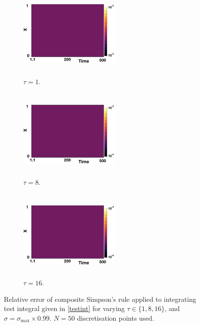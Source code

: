 \begin{figure}[H]
    \centering
    \begin{subfigure}[t]{0.32\textwidth}
        \centering
        \includegraphics[width=5cm,height=4.5cm]{disterr.png}
        \caption{$\tau=1$.}
        \label{}
    \end{subfigure}
    \hfill
    \begin{subfigure}[t]{0.32\textwidth}
        \centering
        \includegraphics[width=5cm,height=4.5cm]{disterr.png}
        \caption{$\tau=8$.}
        \label{}
    \end{subfigure}
    \hfill
    \begin{subfigure}[t]{0.32\textwidth}
        \centering
        \includegraphics[width=5cm,height=4.5cm]{disterr.png}
        \caption{$\tau=16$.}
        \label{}
    \end{subfigure}
    \caption{Relative error of composite Simpson's rule applied to integrating test integral given in \eqref{testint} for varying $\tau\in\{1,8,16\}$, and $\sigma=\sigma_{\max}\times0.99$. $N=50$ discretisation points used.}
    \label{fig:tempquad}
\end{figure}

